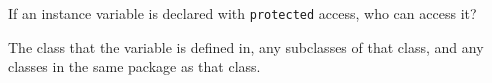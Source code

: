 If an instance variable is declared with {\tt protected} access, who can access it? \\
\begin{answer}
The class that the variable is defined in, any subclasses of that class, and any classes in the same package as that class.
\end{answer}
